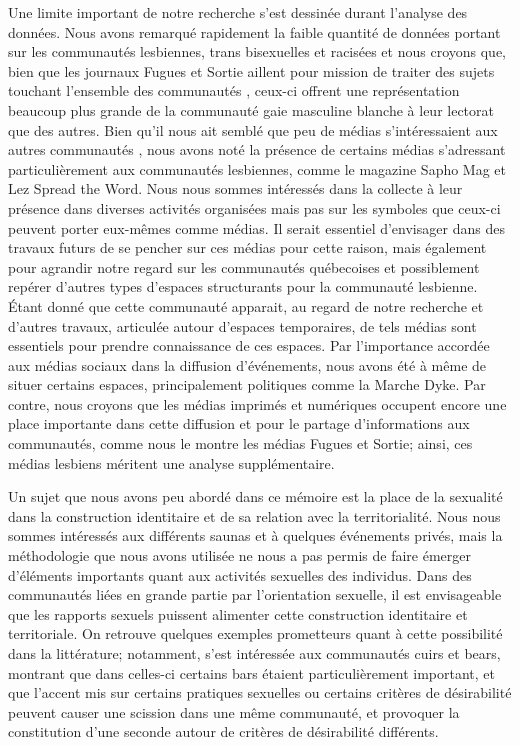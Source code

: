 Une limite important de notre recherche s'est dessinée durant l'analyse des données.
Nous avons remarqué rapidement la faible quantité de données portant sur les communautés lesbiennes, trans bisexuelles et racisées et nous croyons que, bien que les journaux Fugues et Sortie aillent pour mission de traiter des sujets touchant l'ensemble des communautés \lgbt{}, ceux-ci offrent une représentation beaucoup plus grande de la communauté gaie masculine blanche à leur lectorat que des autres.
Bien qu'il nous ait semblé que peu de médias s'intéressaient aux autres communautés \lgbt, nous avons noté la présence de certains médias s'adressant particulièrement aux communautés lesbiennes, comme le magazine Sapho Mag et Lez Spread the Word.
Nous nous sommes intéressés dans la collecte à leur présence dans diverses activités organisées mais pas sur les symboles que ceux-ci peuvent porter eux-mêmes comme médias.
Il serait essentiel d'envisager dans des travaux futurs de se pencher sur ces médias pour cette raison, mais également pour agrandir notre regard sur les communautés \lgbt québecoises et possiblement repérer d'autres types d'espaces structurants pour la communauté lesbienne.
Étant donné que cette communauté apparait, au regard de notre recherche et d'autres travaux, articulée autour d'espaces temporaires, de tels médias sont essentiels pour prendre connaissance de ces espaces.
Par l'importance accordée aux médias sociaux dans la diffusion d'événements, nous avons été à même de situer certains espaces, principalement politiques comme la Marche Dyke. 
Par contre, nous croyons que les médias imprimés et numériques occupent encore une place importante dans cette diffusion et pour le partage d'informations aux communautés, comme nous le montre les médias Fugues et Sortie; ainsi, ces médias lesbiens méritent une analyse supplémentaire.

Un sujet que nous avons peu abordé dans ce mémoire est la place de la sexualité dans la construction identitaire et de sa relation avec la territorialité.
Nous nous sommes intéressés aux différents saunas et à quelques événements privés, mais la méthodologie que nous avons utilisée ne nous a pas permis de faire émerger d'éléments importants quant aux activités sexuelles des individus.
Dans des communautés liées en grande partie par l'orientation sexuelle, il est envisageable que les rapports sexuels puissent alimenter cette construction identitaire et territoriale.
On retrouve quelques exemples prometteurs quant à cette possibilité dans la littérature; notamment, \citet{Hennen2013} s'est intéressée aux communautés cuirs et bears, montrant que dans celles-ci certains bars étaient particulièrement important, et que l'accent mis sur certains pratiques sexuelles ou certains critères de désirabilité peuvent causer une scission dans une même communauté, et provoquer la constitution d'une seconde autour de critères de désirabilité différents.

